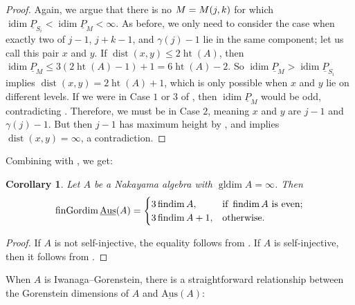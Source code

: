 \documentclass[a4paper]{amsart}
\newtheorem{corollary}[theorem]{Corollary}
\theoremstyle{definition}
\theoremstyle{remark}
\numberwithin{equation}{theorem}
\newcommand{\findim}{\operatorname{findim}}
\newcommand{\sAus}{\operatorname{\underline{Aus}}}
\newcommand{\pstab}[1]{\underline{P}_{#1}}
\newcommand{\fingordim}{\operatorname{finGordim}}
\newcommand{\height}{\operatorname{ht}}
\newcommand{\idim}{\operatorname{idim}}
\newcommand{\gldim}{\operatorname{gldim}}
\newcommand{\dist}{\operatorname{dist}}
\begin{document}
\begin{proof}
  Again, we argue that there is no $M = \mik[j]$ for which  $\idim \pstab{S_i} < \idim \pstab{M} < \infty$.
  As before, we only need to consider the case when exactly two of $j-1$,
  $j + k - 1$, and $\gamma(j)-1$ lie in the same component; let us call this pair $x$ and $y$.
  If $\dist(x,y) \leq 2 \height(A)$, then $\idim \pstab{M} \leq 3(2 \height(A) - 1) + 1 = 6 \height(A) - 2$.
  So $\idim \pstab{M} > \idim \pstab{S_i}$ implies $\dist(x,y) = 2 \height(A) + 1$, which is only possible when $ x $ and $ y $ lie on different levels.
  If we were in Case $1$ or $3$ of , then $\idim \pstab{M}$ would be odd, contradicting .
  Therefore, we must be in Case $2$, meaning $x$ and $y$ are $j - 1$ and $\gamma(j) - 1$.
  But then $ j-1 $ has maximum height by , and  implies $ \dist(x,y) = \infty $, a contradiction.
\end{proof}

Combining  with , we get:

\begin{corollary}\label{cor:finGordim&findim}
    Let $ A $ be a Nakayama algebra with $ \gldim A = \infty $. Then
        \[
            \fingordim \sAus(A)  =  \begin{cases}
                3 \findim A , & \text{if $ \, \findim A $ is even;} \\
                3 \findim A + 1 , & \text{otherwise.}
                    \end{cases}
        \]
\end{corollary}
\begin{proof}
    If $ A $ is not self-injective, the equality follows from . If $ A $ is self-injective, then it follows from .
\end{proof}

When $ A $ is Iwanaga--Gorenstein, there is a straightforward relationship between the Gorenstein dimensions of $ A $ and $ \sAus(A) $:
\end{document}
